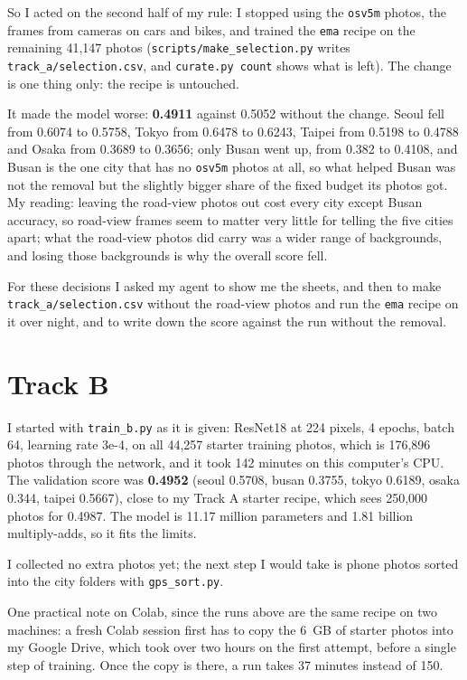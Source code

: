 \documentclass[11pt]{article}
\begin{document}

So I acted on the second half of my rule: I stopped using the
\texttt{osv5m} photos, the frames from cameras on cars and bikes, and trained
the \texttt{ema} recipe on the remaining 41,147 photos (\texttt{scripts/make\_selection.py}
writes \texttt{track\_a/selection.csv}, and \texttt{curate.py count} shows what
is left). The change is one thing only: the recipe is untouched.

It made the model worse: \textbf{0.4911} against 0.5052 without the change.
Seoul fell from 0.6074 to 0.5758, Tokyo from 0.6478 to 0.6243, Taipei from
0.5198 to 0.4788 and Osaka from 0.3689 to 0.3656; only Busan went up, from
0.382 to 0.4108, and Busan is the one city that has no \texttt{osv5m} photos at
all, so what helped Busan was not the removal but the slightly bigger share of
the fixed budget its photos got. My reading: leaving the road-view photos out
cost every city except Busan accuracy, so road-view frames seem to matter very
little for telling the five cities apart; what the road-view photos did carry
was a wider range of backgrounds, and losing those backgrounds is why the
overall score fell.

For these decisions I asked my agent to show me the sheets, and then to make
\texttt{track\_a/selection.csv} without the road-view photos and run the
\texttt{ema} recipe on it over night, and to write down the score against the
run without the removal.

\section*{Track B}

I started with \texttt{train\_b.py} as it is given: ResNet18 at 224 pixels,
4 epochs, batch 64, learning rate 3e-4, on all 44,257 starter training photos,
which is 176,896 photos through the network, and it took 142 minutes on this
computer's CPU. The validation score was \textbf{0.4952} (seoul 0.5708,
busan 0.3755, tokyo 0.6189, osaka 0.344, taipei 0.5667), close to my Track A
starter recipe, which sees 250,000 photos for 0.4987. The model is 11.17
million parameters and 1.81 billion multiply-adds, so it fits the limits.

I collected no extra photos yet; the next step I would take is phone photos
sorted into the city folders with \texttt{gps\_sort.py}.

One practical note on Colab, since the runs above are the same recipe on two
machines: a fresh Colab session first has to copy the 6~GB of starter photos into
my Google Drive, which took over two hours on the first attempt, before a single
step of training. Once the copy is there, a run takes 37 minutes instead of 150.
\end{document}
